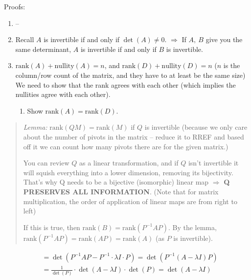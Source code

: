 \documentclass[12pt]{article}
\theoremstyle{plain}
\theoremstyle{remark}
\theoremstyle{definition}
\begin{document}
Proofs:

\begin{enumerate}
\def\labelenumi{\arabic{enumi}.}
\item
  --
\item
  Recall \(A\) is invertible if and only if \(\det(A) \neq 0\).
  \(\Rightarrow\) If \(A,\ B\) give you the same determinant, \(A\) is
  invertible if and only if \(B\) is invertible.
\item
  \(\text{rank}(A) + \text{nullity}(A) = n\), and
  \(\text{rank}(D) + \text{nullity}(D) = n\) (\(n\) is the column/row
  count of the matrix, and they have to at least be the same size) We
  need to show that the rank agrees with each other (which implies the
  nullities agree with each other).

  \begin{enumerate}
  \def\labelenumii{\alph{enumii}.}
  \item
    Show \(\text{rank}(A) = \text{rank}(D)\).
  \end{enumerate}
\end{enumerate}

\begin{quote}
\emph{Lemma:} \(\text{rank}\left( QM \right) = \text{rank}(M)\)
if \(Q\) is invertible (because we only care about the number of pivots
in the matrix -- reduce it to RREF and based off it we can count how
many pivots there are for the given matrix.)

You can review \(Q\) as a linear transformation, and if \(Q\) isn't
invertible it will squish everything into a lower dimension, removing
its bijectivity. That's why Q needs to be a bijective (isomorphic)
linear map \(\Rightarrow\) \textbf{Q PRESERVES ALL INFORMATION}. (Note
that for matrix multiplication, the order of application of linear maps
are from right to left)

If this is true, then
\(\text{rank}(B) = \text{rank}\left( P^{- 1}AP \right)\). By the
lemma,
\(\text{rank}\left( P^{- 1}AP \right) = \text{rank}\left( AP \right) = \text{rank}(A)\)
(as \(P\) is invertible).
\end{quote}

\begin{align*}
&= \det\left( P^{- 1}AP - P^{- 1} \cdot \lambda I \cdot P \right) = \det\left( P^{- 1}\left( A - \lambda I \right)P \right) \\
&= \frac{1}{\det(P)} \cdot \det\left( A - \lambda I \right) \cdot \det(P) = \det\left( A - \lambda I \right)
\end{align*}
\end{document}
